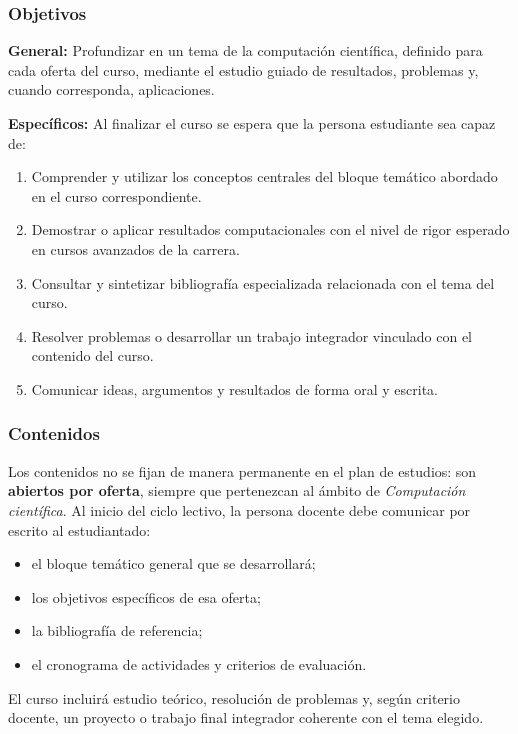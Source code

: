 \begin{refsection}
\subsubsection*{Objetivos}

\textbf{General:} Profundizar en un tema de la computación científica, definido para cada oferta del curso, mediante el estudio guiado de resultados, problemas y, cuando corresponda, aplicaciones.

\textbf{Específicos:} Al finalizar el curso se espera que la persona estudiante sea capaz de:

\begin{enumerate}
\item Comprender y utilizar los conceptos centrales del bloque temático abordado en el curso correspondiente.
\item Demostrar o aplicar resultados computacionales con el nivel de rigor esperado en cursos avanzados de la carrera.
\item Consultar y sintetizar bibliografía especializada relacionada con el tema del curso.
\item Resolver problemas o desarrollar un trabajo integrador vinculado con el contenido del curso.
\item Comunicar ideas, argumentos y resultados de forma oral y escrita.
\end{enumerate}

\subsubsection*{Contenidos}

Los contenidos no se fijan de manera permanente en el plan de estudios: son \textbf{abiertos por oferta}, siempre que pertenezcan al ámbito de \emph{Computación científica}. Al inicio del ciclo lectivo, la persona docente debe comunicar por escrito al estudiantado:

\begin{itemize}
\item el bloque temático general que se desarrollará;
\item los objetivos específicos de esa oferta;
\item la bibliografía de referencia;
\item el cronograma de actividades y criterios de evaluación.
\end{itemize}

El curso incluirá estudio teórico, resolución de problemas y, según criterio docente, un proyecto o trabajo final integrador coherente con el tema elegido.


\end{refsection}
